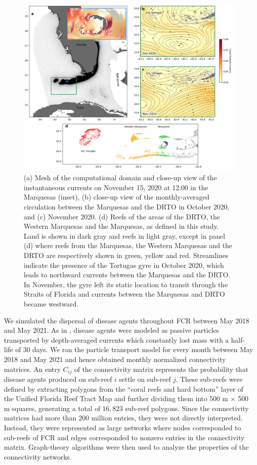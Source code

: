 \begin{figure}
    \centering
    \includegraphics[width=.95\textwidth]{chapters/drto/figures/fig1.jpg}
    \caption{(a) Mesh of the computational domain and close-up view of the instantaneous currents on November 15, 2020 at 12:00 in the Marquesas (inset), (b) close-up view of the monthly-averaged circulation between the Marquesas and the DRTO in October 2020, and (c) November 2020. (d) Reefs of the areas of the DRTO, the Western Marquesas and the Marquesas, as defined in this study. Land is shown in dark gray and reefs in light gray, except in panel (d) where reefs from the Marquesas, the Western Marquesas and the DRTO are respectively shown in green, yellow and red. Streamlines indicate the presence of the Tortugas gyre in October 2020, which leads to northward currents between the Marquesas and the DRTO. In November, the gyre left its static location to transit through the Straits of Florida and currents between the Marquesas and DRTO became westward.}
    \label{fig:fig1_drto}
\end{figure}

We simulated the dispersal of disease agents throughout FCR between May 2018 and May 2021. As in \cite{dobbelaere2020coupled}, disease agents were modeled as passive particles transported by depth-averaged currents which constantly lost mass with a half-life of 30 days. We ran the particle transport model for every month between May 2018 and May 2021 and hence obtained monthly normalized connectivity matrices. An entry $C_{ij}$ of the connectivity matrix represents the probability that disease agents produced on sub-reef $i$ settle on sub-reef $j$. These sub-reefs were defined by extracting polygons from the “coral reefs and hard bottom” layer of the Unified Florida Reef Tract Map \citep{fwc2017unified} and further dividing them into 500 m $\times$ 500 m squares, generating a total of $16,823$ sub-reef polygons. Since the connectivity matrices had more than 200 million entries, they were not directly interpreted. Instead, they were represented as large networks where nodes corresponded to sub-reefs of FCR and edges corresponded to nonzero entries in the connectivity matrix. Graph-theory algorithms were then used to analyze the properties of the connectivity networks. 

